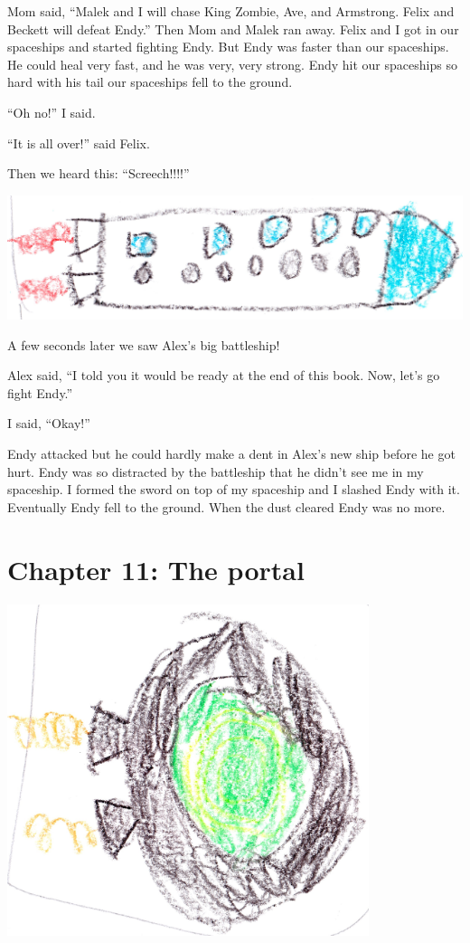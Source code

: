 \documentclass[12pt,oneside]{krantz}
\begin{document}
Mom said, ``Malek and I will chase King Zombie, Ave, and Armstrong.
Felix and Beckett will defeat Endy.'' Then Mom and Malek ran away. Felix
and I got in our spaceships and started fighting Endy. But Endy was
faster than our spaceships. He could heal very fast, and he was very,
very strong. Endy hit our spaceships so hard with his tail our
spaceships fell to the ground.

``Oh no!'' I said.

``It is all over!'' said Felix.

Then we heard this: ``Screech!!!!''

\includegraphics[width=6.25in,height=\textheight]{img/longrocket.jpg}

A few seconds later we saw Alex's big battleship!

Alex said, ``I told you it would be ready at the end of this book. Now,
let's go fight Endy.''

I said, ``Okay!''

Endy attacked but he could hardly make a dent in Alex's new ship before
he got hurt. Endy was so distracted by the battleship that he didn't see
me in my spaceship. I formed the sword on top of my spaceship and I
slashed Endy with it. Eventually Endy fell to the ground. When the dust
cleared Endy was no more.

\hypertarget{chapter-11-the-portal}{%
\chapter*{Chapter 11: The portal}\label{chapter-11-the-portal}}


\includegraphics[width=4.16667in,height=\textheight]{img/portal.jpg}
\end{document}
